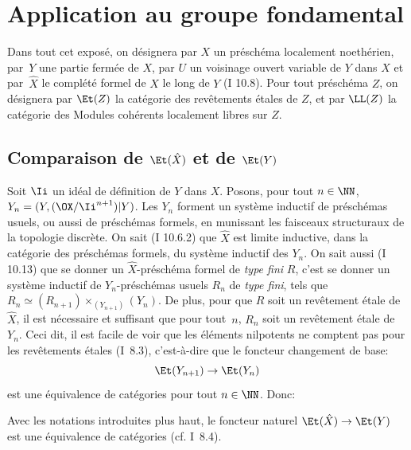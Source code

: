 \chapter{Application au groupe fondamental} \label{X}

\renewcommand{\theequation}{\arabic{equation}}

Dans tout cet expos\'e, on d\'esignera par $X$ un pr\'esch\'ema localement noeth\'erien, par~$Y$ une partie ferm\'ee de $X$, par $U$ un voisinage ouvert variable de $Y$ dans $X$ et par~$\hat{X}$ le compl\'et\'e formel de $X$ le long de $Y$ (\EGA I 10.8). Pour tout pr\'esch\'ema $Z$, on d\'esignera par $\Et(Z)$ la cat\'egorie des rev\^etements \'etales de $Z$, et par $\LL(Z)$\label{pX.1} la cat\'egorie des Modules coh\'erents localement libres sur $Z$.

\enlargethispage{3mm}%
\section{Comparaison de $\Et(\hat{X})$ et de $\Et(Y)$} \label{X.1}

Soit $\Ii$ un id\'eal de d\'efinition de $Y$ dans $X$. Posons, pour tout $n\in\NN$, $Y_n=(Y, (\OX/\Ii^{n+1}){|Y})$. Les $Y_n$ forment un syst\`eme inductif de pr\'esch\'emas usuels, ou aussi de pr\'esch\'emas formels, en munissant les faisceaux structuraux de la topologie discr\`ete. On sait (\EGA I 10.6.2) que $\hat{X}$ est limite inductive, dans la cat\'egorie des pr\'esch\'emas formels, du syst\`eme inductif des $Y_n$. On sait aussi (\EGA I 10.13) que se donner un $\hat{X}$-pr\'esch\'ema formel de \emph{type fini} $R$, c'est se donner un syst\`eme inductif de $Y_n$-pr\'esch\'emas usuels $R_n$ de \emph{type fini}, tels que $R_n\simeq(R_{n+1})\times_{(Y_{n+1})}(Y_n)$. De plus, pour que $R$ soit un rev\^etement \'etale de $\hat{X}$, il est n\'ecessaire et suffisant que pour tout~$n$, $R_n$ soit un rev\^etement \'etale de $Y_n$. Ceci dit, il est facile de voir que les \'el\'ements nilpotents ne comptent pas pour les rev\^etements \'etales (\SGA I~8.3), c'est-\`a-dire que le foncteur changement de base:
\[
\Et(Y_{n+1}) \to \Et(Y_n)
\]
est une \'equivalence de cat\'egories pour tout $n\in\NN$. Donc:

\begin{proposition} \label{X.1.1}
Avec les notations introduites plus haut, le foncteur naturel $\Et(\hat{X})\to\Et(Y)$ est une \'equivalence de cat\'egories (cf. \textup{\SGA I~8.4}).
\end{proposition}

